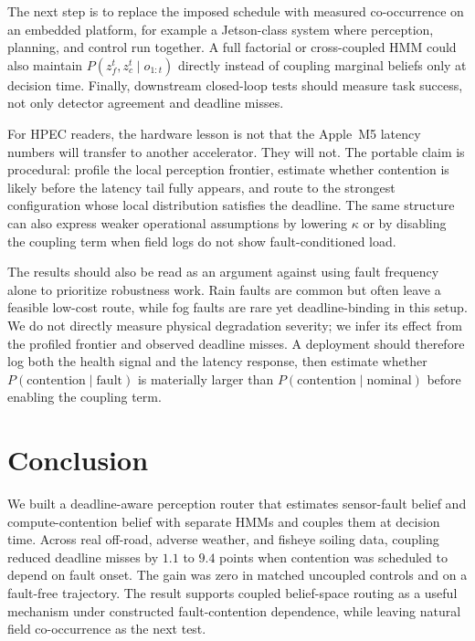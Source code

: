 \documentclass[conference]{IEEEtran}
\begin{document}
The next step is to replace the imposed schedule with measured
co-occurrence on an embedded platform, for example a Jetson-class
system where perception, planning, and control run together. A full
factorial or cross-coupled HMM could also maintain
$P(z_f^t,z_c^t\mid o_{1:t})$ directly instead of coupling marginal
beliefs only at decision time. Finally, downstream closed-loop tests
should measure task success, not only detector agreement and
deadline misses.

For HPEC readers, the hardware lesson is not that the Apple~M5
latency numbers will transfer to another accelerator. They will not.
The portable claim is procedural: profile the local perception
frontier, estimate whether contention is likely before the latency
tail fully appears, and route to the strongest configuration whose
local distribution satisfies the deadline. The same structure can
also express weaker operational assumptions by lowering $\kappa$ or
by disabling the coupling term when field logs do not show
fault-conditioned load.

The results should also be read as an argument against using fault
frequency alone to prioritize robustness work. Rain faults are common
but often leave a feasible low-cost route, while fog faults are rare
yet deadline-binding in this setup. We do not directly measure
physical degradation severity; we infer its effect from the profiled
frontier and observed deadline misses. A deployment should therefore
log both the health signal and the latency response, then estimate
whether $P(\mathrm{contention}\mid\mathrm{fault})$ is materially
larger than $P(\mathrm{contention}\mid\mathrm{nominal})$ before
enabling the coupling term.

\section{Conclusion}
\label{sec:conclusion}

We built a deadline-aware perception router that estimates
sensor-fault belief and compute-contention belief with separate HMMs
and couples them at decision time. Across real off-road, adverse
weather, and fisheye soiling data, coupling reduced deadline misses
by $1.1$ to $9.4$ points when contention was scheduled to depend on
fault onset. The gain was zero in matched uncoupled controls and on
a fault-free trajectory. The result supports coupled belief-space
routing as a useful mechanism under constructed fault-contention
dependence, while leaving natural field co-occurrence as the next
test.



\end{document}
